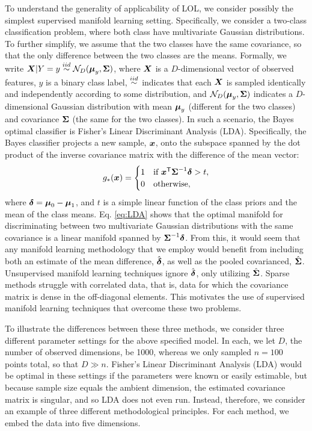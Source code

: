 \documentclass[10pt]{article}
\begin{document}
To understand the generality of applicability of LOL, we consider possibly the simplest supervised manifold learning setting.  Specifically, we consider a two-class classification problem, where both class have multivariate Gaussian distributions.  To further simplify, we assume that the two classes have the same covariance, so that the only difference between the two classes are the means. 
Formally, we write $\boldsymbol{X} | Y=y \overset{iid}{\sim} \mathcal{N}_D(\boldsymbol{\mu}_y, \boldsymbol{\Sigma})$, where $\boldsymbol{X}$ is a $D$-dimensional vector of observed features, $y$ is a binary class label, $\overset{iid}{\sim}$ indicates that each $\boldsymbol{X}$ is sampled identically and independently according to some distribution, and $\mathcal{N}_D(\boldsymbol{\mu}_y,\boldsymbol{\Sigma})$ indicates a $D$-dimensional Gaussian distribution with mean $\boldsymbol{\mu}_y$ (different for the two classes) and covariance $\boldsymbol{\Sigma}$ (the same for the two classes).
In such a scenario,  the Bayes optimal classifier is Fisher's Linear Discriminant Analysis (LDA).  Specifically, the Bayes classifier projects a new sample, $\boldsymbol{x}$, onto the subspace spanned by the dot product of the inverse covariance matrix with the difference of the mean vector:
\begin{align}
g_*(\boldsymbol{x}) = 
\begin{cases}
      1 & \text{if}\ \boldsymbol{x}^{\mathsf{T}} \boldsymbol{\Sigma}^{-1} \boldsymbol{\delta} > t, \\
      0 & \text{otherwise},
    \end{cases} \label{eq:LDA}
\end{align}
\noindent where $\boldsymbol{\delta}=\boldsymbol{\mu}_0-\boldsymbol{\mu}_1$, and $t$ is a simple linear function of the class priors and the mean of the class means.  
Eq. \eqref{eq:LDA} shows that the optimal manifold for discriminating between two multivariate Gaussian distributions with the same covariance is a linear manifold spanned by $\boldsymbol{\Sigma}^{-1} \boldsymbol{\delta}$.  
From this, it would seem that any manifold learning methodology that we employ would benefit from including both an estimate of the mean difference, $\hat{\boldsymbol{\delta}}$, as well as the pooled covarianced, $\hat{\boldsymbol{\Sigma}}$.  Unsupervised manifold learning techniques ignore $\hat{\boldsymbol{\delta}}$, only utilizing $\hat{\boldsymbol{\Sigma}}$.  Sparse methods struggle with correlated data, that is, data for which the covariance matrix is dense in the off-diagonal elements.  This motivates the use of supervised manifold learning techniques that overcome these two problems.  

To illustrate the differences between these three methods, we consider three different parameter settings for the above specified model.  In each, we let $D$, the number of observed dimensions, be 1000, whereas we only sampled $n=100$ points total, so that $D \gg n$.  
Fisher's Linear Discriminant Analysis (LDA) would be optimal in these settings if the parameters were known or easily estimable, but because sample size equals the ambient dimension, the estimated covariance matrix is singular, and so LDA does not even run. Instead, therefore, we consider an example of three different methodological principles. 
For each method, we embed the data into five dimensions.  
\end{document}
